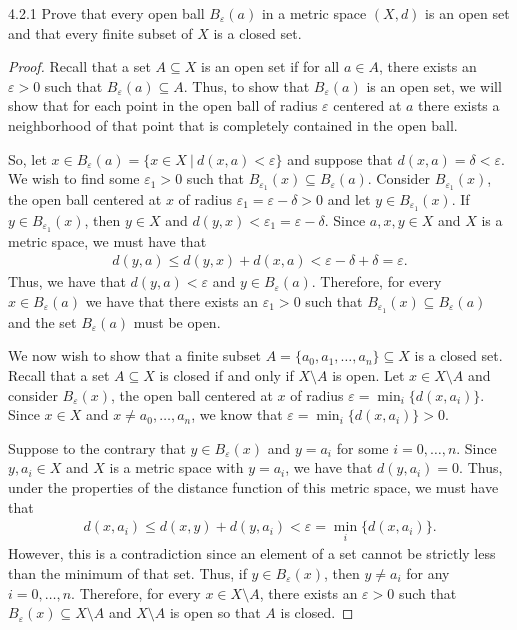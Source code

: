 \begin{problem}{4.2.1}
  Prove that every open ball $B_\varepsilon(a)$ in a metric space $(X, d)$ is an open set
  and that every finite subset of $X$ is a closed set.
\end{problem}

\begin{proof}
  Recall that a set $A \subseteq X$ is an open set if for all $a \in A$, there
  exists an $\varepsilon > 0$ such that $B_\varepsilon(a) \subseteq A$. Thus, to
  show that $B_\varepsilon(a)$ is an open set, we will show that for each point in the open
  ball of radius $\varepsilon$ centered at $a$ there exists a neighborhood of
  that point that is completely contained in the open ball.

  So, let $x \in B_\varepsilon(a) = \{x \in X \ |\ d(x, a) < \varepsilon\}$ and
  suppose that $d(x, a) = \delta < \varepsilon$. We wish to find some $\varepsilon_1 > 0$
  such that $B_{\varepsilon_1}(x) \subseteq B_\varepsilon(a)$. Consider $B_{\varepsilon_1}(x)$,
  the open ball centered at $x$ of radius $\varepsilon_1 = \varepsilon - \delta > 0$
  and let $y \in B_{\varepsilon_1}(x)$. If $y\in B_{\varepsilon_1}(x)$, then $y\in X$ and $d(y, x) < \varepsilon_1 = \varepsilon - \delta$.
  Since $a, x, y \in X$ and $X$ is a metric space, we must have that
  \begin{align*}
    d(y, a) \leq d(y, x) + d(x, a) < \varepsilon - \delta + \delta = \varepsilon.
  \end{align*}
  Thus, we have that $d(y, a) < \varepsilon$ and $y \in B_\varepsilon(a)$.  Therefore, for every
  $x \in B_\varepsilon(a)$ we have that there exists an $\varepsilon_1 > 0$ such that $B_{\varepsilon_1}(x) \subseteq B_\varepsilon(a)$
  and the set $B_\varepsilon(a)$ must be open.

  We now wish to show that a finite subset $A = \{a_0, a_1, \dots, a_n\} \subseteq X$ is a closed set.
  Recall that a set $A \subseteq X$ is closed if and only if $X \setminus A$ is open. Let $x \in X \setminus A$
  and consider $B_{\varepsilon}(x)$, the open ball centered at $x$ of radius $\varepsilon = \min_i\{d(x, a_i)\}$.
  Since $x \in X$ and $x \neq a_0, \dots, a_n$, we know that $\varepsilon = \min_i\{d(x, a_i)\} > 0$.

  Suppose to the contrary that $y \in B_{\varepsilon}(x)$ and $y = a_i$ for some $i=0,\dots, n$.
  Since $y, a_i \in X$ and $X$ is a metric space with $y = a_i$, we have that $d(y, a_i) = 0$.
  Thus, under the properties of the distance function of this metric space, we must have that
  \begin{align*}
    d(x, a_i) \leq d(x, y) + d(y, a_i) < \varepsilon = \min_i\{d(x, a_i)\}.
  \end{align*}
  However, this is a contradiction since an element of a set cannot be strictly
  less than the minimum of that set. Thus, if $y \in B_{\varepsilon}(x)$, then $y \neq a_i$ for any $i=0,\dots, n$.
  Therefore, for every $x \in X \setminus A$, there exists an $\varepsilon > 0$ such that $B_{\varepsilon}(x) \subseteq X \setminus A$ and $X \setminus A$ is open so that $A$ is closed.
\end{proof}

\newpage
